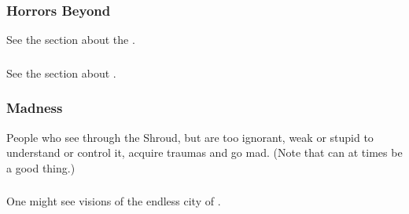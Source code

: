 \subsubsection{Horrors Beyond}
See the section about the . 





\subsubsection{\Iquin}
See the section about . 





\subsubsection{Madness}
People who see through the Shroud, but are too ignorant, weak or stupid to understand or control it, acquire traumas and go mad. (Note that  can at times be a good thing.)





\subsubsection{\Nyx}
One might see visions of the endless city of \Nyx. 

